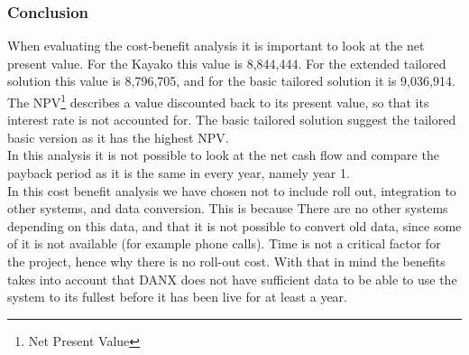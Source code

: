 \subsubsection{Conclusion}

When evaluating the cost-benefit analysis it is important to look at the net present value. For the Kayako this value is 8,844,444. For the extended tailored solution this value is 8,796,705, and for the basic tailored solution it is 9,036,914.\cite{img002}\cite{img003}\cite{img004}
The NPV\footnote{Net Present Value} describes a value discounted back to its present value, so that its interest rate is not accounted for. The basic tailored solution suggest the tailored basic version as it has the highest NPV.\\
In this analysis it is not possible to look at the net cash flow and compare the payback period as it is the same in every year, namely year 1.\\
In this cost benefit analysis we have chosen not to include roll out, integration to other systems, and data conversion. This is because There are no other systems depending on this data, and that it is not possible to convert old data, since some of it is not available (for example phone calls). Time is not a critical factor for the project, hence why there is no roll-out cost. With that in mind the benefits takes into account that DANX does not have sufficient data to be able to use the system to its fullest before it has been live for at least a year.

